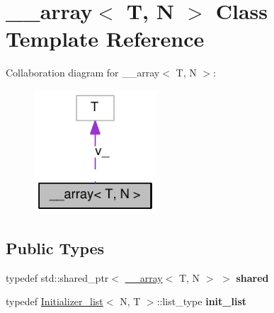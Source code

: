 \hypertarget{class____array}{
\section{\_\-\_\-array$<$ T, N $>$ Class Template Reference}
\label{class____array}
}
Collaboration diagram for \_\-\_\-array$<$ T, N $>$:\nopagebreak
\begin{figure}[H]
\begin{center}
\leavevmode
\includegraphics[width=130pt]{class____array__coll__graph}
\end{center}
\end{figure}
\subsection*{Public Types}
\begin{DoxyCompactItemize}
\item 
\hypertarget{class____array_a90230a0abce0d451b9425b69b24534e5}{
typedef std::shared\_\-ptr$<$ \hyperlink{class____array}{\_\-\_\-array}$<$ T, N $>$ $>$ {\bfseries shared}}
\label{class____array_a90230a0abce0d451b9425b69b24534e5}

\item 
\hypertarget{class____array_ab58bead881f51e40d3fb088e8adb2d77}{
typedef \hyperlink{structInitializer__list}{Initializer\_\-list}$<$ N, T $>$::list\_\-type {\bfseries init\_\-list}}
\label{class____array_ab58bead881f51e40d3fb088e8adb2d77}

\end{DoxyCompactItemize}
